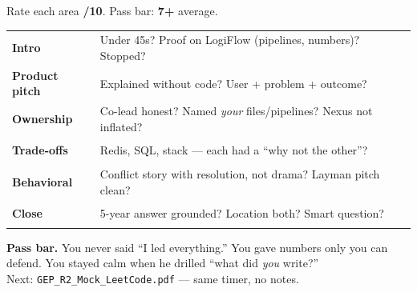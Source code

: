 \documentclass[11pt,a4paper]{article}
\newcommand{\card}[1]{%
  \par\vspace{4pt}%
  \noindent\colorbox{soft}{%
    \parbox{\dimexpr\textwidth-2\fboxsep}{\vspace{5pt}#1\vspace{5pt}}%
  }\par\vspace{5pt}%
}
\begin{document}
Rate each area \textbf{/10}. Pass bar: \textbf{7+} average.

\begin{tabular}{@{}p{3.2cm}p{9cm}c@{}}
\textbf{Intro} & Under 45s? Proof on LogiFlow (pipelines, numbers)? Stopped? & \rule{1.4cm}{0.4pt} \\
\textbf{Product pitch} & Explained without code? User + problem + outcome? & \rule{1.4cm}{0.4pt} \\
\textbf{Ownership} & Co-lead honest? Named \emph{your} files/pipelines? Nexus not inflated? & \rule{1.4cm}{0.4pt} \\
\textbf{Trade-offs} & Redis, SQL, stack --- each had a ``why not the other''? & \rule{1.4cm}{0.4pt} \\
\textbf{Behavioral} & Conflict story with resolution, not drama? Layman pitch clean? & \rule{1.4cm}{0.4pt} \\
\textbf{Close} & 5-year answer grounded? Location both? Smart question? & \rule{1.4cm}{0.4pt} \\
\end{tabular}

\vspace{8pt}
\card{\textbf{Pass bar.} You never said ``I led everything.'' You gave numbers only you can defend. You stayed calm when he drilled ``what did \emph{you} write?''\\[4pt]
Next: \texttt{GEP\_R2\_Mock\_LeetCode.pdf} --- same timer, no notes.}
\end{document}
